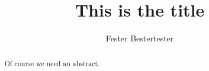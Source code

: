 \documentclass{article}
\title{This is the title}
\author{Fester Bestertester}
\begin{document}
\maketitle
\begin{abstract}
  Of course we need an abstract.
\end{abstract}



\end{document}
